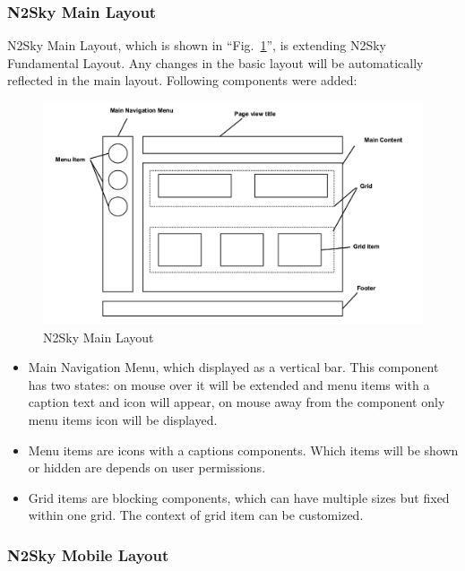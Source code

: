 \subsubsection{N2Sky Main Layout}\label{N2Sky Main Layout}

N2Sky Main Layout, which is shown in ``Fig.~\ref{fig:layout_main}'',  is extending N2Sky Fundamental Layout. Any changes in the basic layout will be automatically reflected in the main layout. Following components were added:

\begin{figure}[H]
\begin{center}
  \includegraphics[width=\linewidth]{components/3/components/layout_main.png}
  \caption{N2Sky Main Layout}
  \label{fig:layout_main}
\end{center}
\end{figure}

\begin{itemize}
\item Main Navigation Menu, which displayed as a vertical bar. This component has two states: on mouse over it will be extended and menu items with a caption text and icon will appear, on mouse away from the component only menu items icon will be displayed. 
\item Menu items are icons with a captions components. Which items will be shown or hidden are depends on user permissions.
\item Grid items are blocking components, which can have multiple sizes but fixed within one grid. The context of grid item can be customized. 
\end{itemize}



\subsubsection{N2Sky Mobile Layout}\label{N2Sky Mobile Layout}

